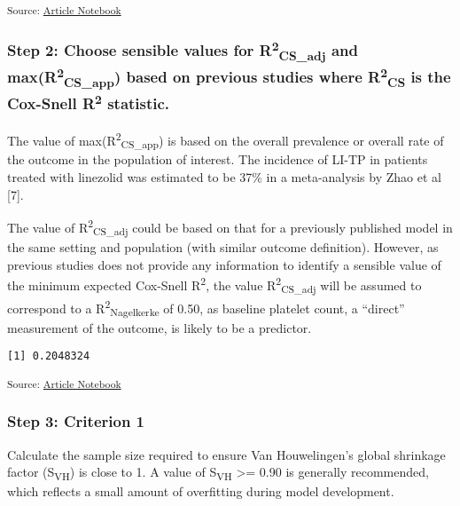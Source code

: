 \documentclass[
  letterpaper,
  DIV=11,
  numbers=noendperiod]{scrartcl}
\begin{document}
\textsubscript{Source:
\href{https://AnTangQuoc.github.io/LZD-TP-pred-model/index.qmd.html}{Article
Notebook}}

\subsubsection{\texorpdfstring{Step 2: Choose sensible values for
R\textsuperscript{2}\textsubscript{CS\_adj} and
max(R\textsuperscript{2}\textsubscript{CS\_app}) based on previous
studies where R\textsuperscript{2}\textsubscript{CS} is the Cox-Snell
R\textsuperscript{2}
statistic.}{Step 2: Choose sensible values for R2CS\_adj and max(R2CS\_app) based on previous studies where R2CS is the Cox-Snell R2 statistic.}}\label{step-2-choose-sensible-values-for-r2cs_adj-and-maxr2cs_app-based-on-previous-studies-where-r2cs-is-the-cox-snell-r2-statistic.}

The value of max(R\textsuperscript{2}\textsubscript{CS\_app}) is based
on the overall prevalence or overall rate of the outcome in the
population of interest. The incidence of LI-TP in patients treated with
linezolid was estimated to be 37\% in a meta-analysis by Zhao et al
{[}7{]}.

The value of R\textsuperscript{2}\textsubscript{CS\_adj} could be based
on that for a previously published model in the same setting and
population (with similar outcome definition). However, as previous
studies does not provide any information to identify a sensible value of
the minimum expected Cox-Snell R\textsuperscript{2}, the value
R\textsuperscript{2}\textsubscript{CS\_adj} will be assumed to
correspond to a R\textsuperscript{2}\textsubscript{Nagelkerke} of 0.50,
as baseline platelet count, a ``direct'' measurement of the outcome, is
likely to be a predictor.

\begin{verbatim}
[1] 0.2048324
\end{verbatim}

\textsubscript{Source:
\href{https://AnTangQuoc.github.io/LZD-TP-pred-model/index.qmd.html}{Article
Notebook}}

\subsubsection{Step 3: Criterion 1}\label{step-3-criterion-1}

Calculate the sample size required to ensure Van Houwelingen's global
shrinkage factor (S\textsubscript{VH}) is close to 1. A value of
S\textsubscript{VH} \textgreater= 0.90 is generally recommended, which
reflects a small amount of overfitting during model development.
\end{document}

